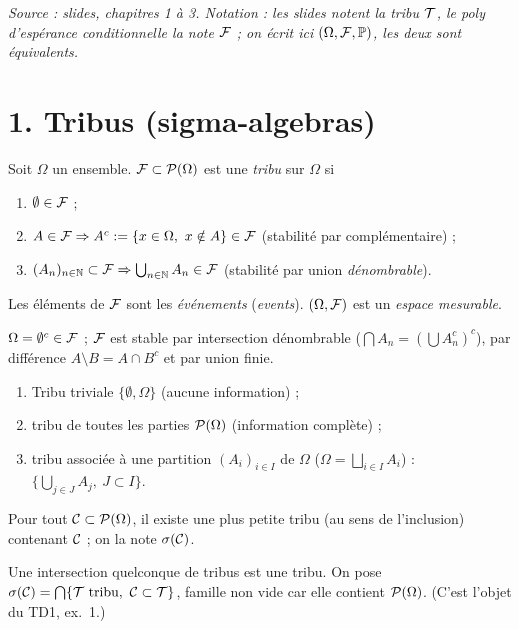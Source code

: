 \documentclass[11pt,a4paper]{article}
\begin{document}

\textit{Source : slides, chapitres 1 à 3. Notation : les slides notent la tribu $\mathcal{T}$, le poly
d'espérance conditionnelle la note $\mathcal{F}$ ; on écrit ici $(\Omega,\mathcal{F},\mathbb{P})$, les deux sont équivalents.}

\section*{1. Tribus (sigma-algebras)}

\begin{definition}\label{C1:tribu}
Soit $\Omega$ un ensemble. $\mathcal{F}\subset\mathcal{P}(\Omega)$ est une \emph{tribu} sur $\Omega$ si
\begin{enumerate}[label=(\roman*)]
  \item $\emptyset\in\mathcal{F}$ ;
  \item $A\in\F \Rightarrow A^c:=\{x\in\Omega,\ x\notin A\}\in\F$ (stabilité par complémentaire) ;
  \item $(A_n)_{n\in\mathbb{N}}\subset\mathcal{F} \Rightarrow \bigcup_{n\in\mathbb{N}}A_n\in\mathcal{F}$ (stabilité par union \emph{dénombrable}).
\end{enumerate}
Les éléments de $\mathcal{F}$ sont les \emph{événements} (\emph{events}). $(\Omega,\mathcal{F})$ est un \emph{espace mesurable}.
\end{definition}

\begin{remarque}
$\Omega=\emptyset^c\in\mathcal{F}$ ; $\mathcal{F}$ est stable par intersection dénombrable
($\bigcap A_n=(\bigcup A_n^c)^c$), par différence $A\setminus B=A\cap B^c$ et par union finie.
\end{remarque}

\begin{exemple}\label{C1:exemples}\leavevmode
\begin{enumerate}
  \item Tribu triviale $\{\emptyset,\Omega\}$ (aucune information) ;
  \item tribu de toutes les parties $\mathcal{P}(\Omega)$ (information complète) ;
  \item tribu associée à une partition $(A_i)_{i\in I}$ de $\Omega$ ($\Omega=\bigsqcup_{i\in I}A_i$) :
  $\bigl\{\bigcup_{j\in J}A_j,\ J\subset I\bigr\}$.
\end{enumerate}
\end{exemple}

\begin{definition}\label{C1:engendree}
Pour tout $\mathcal{C}\subset\mathcal{P}(\Omega)$, il existe une plus petite tribu (au sens de l'inclusion) contenant $\mathcal{C}$ ;
on la note $\sigma(\mathcal{C})$.
\end{definition}
\begin{idee}
Une intersection quelconque de tribus est une tribu. On pose $\sigma(\Cc)=\bigcap\{\Tc \text{ tribu},\ \Cc\subset\Tc\}$,
famille non vide car elle contient $\mathcal{P}(\Omega)$. (C'est l'objet du TD1, ex.~1.)
\end{idee}
\end{document}
